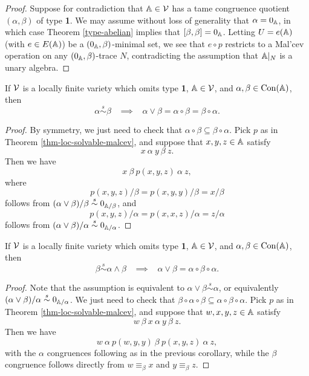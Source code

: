 \begin{appendices}
\begin{proof}
Suppose for contradiction that $\mathbb{A} \in \mathcal{V}$ has a tame congruence quotient $(\alpha,\beta)$ of type \textbf{1}. We may assume without loss of generality that $\alpha = 0_{\mathbb{A}}$, in which case Theorem \ref{type-abelian} implies that $[\beta,\beta] = 0_{\mathbb{A}}$. Letting $U = e(\mathbb{A})$ (with $e \in E(\mathbb{A})$) be a $(0_{\mathbb{A}}, \beta)$-minimal set, we see that $e \circ p$ restricts to a Mal'cev operation on any $(0_{\mathbb{A}},\beta)$-trace $N$, contradicting the assumption that $\mathbb{A}|_N$ is a unary algebra.
\end{proof}

\begin{cor} If $\mathcal{V}$ is a locally finite variety which omits type \textbf{1}, $\mathbb{A} \in \mathcal{V}$, and $\alpha, \beta \in \operatorname{Con}(\mathbb{A})$, then
\[
\alpha \stackrel{s}{\sim} \beta \;\;\; \implies \;\;\; \alpha \vee \beta = \alpha \circ \beta = \beta \circ \alpha.
\]
\end{cor}
\begin{proof} By symmetry, we just need to check that $\alpha \circ \beta \subseteq \beta \circ \alpha$. Pick $p$ as in Theorem \ref{thm-loc-solvable-malcev}, and suppose that $x,y,z \in \mathbb{A}$ satisfy
\[
x\ \alpha\ y\ \beta\ z.
\]
Then we have
\[
x\ \beta\ p(x,y,z)\ \alpha\ z,
\]
where
\[
p(x,y,z)/\beta = p(x,y,y)/\beta = x/\beta
\]
follows from $(\alpha \vee \beta)/\beta \stackrel{s}{\sim} 0_{\mathbb{A}/\beta}$, and
\[
p(x,y,z)/\alpha = p(x,x,z)/\alpha = z/\alpha
\]
follows from $(\alpha \vee \beta)/\alpha \stackrel{s}{\sim} 0_{\mathbb{A}/\alpha}$.
\end{proof}

\begin{cor} If $\mathcal{V}$ is a locally finite variety which omits type \textbf{1}, $\mathbb{A} \in \mathcal{V}$, and $\alpha, \beta \in \operatorname{Con}(\mathbb{A})$, then
\[
\beta \stackrel{s}{\sim} \alpha \wedge \beta \;\;\; \implies \;\;\; \alpha \vee \beta = \alpha \circ \beta \circ \alpha.
\]
\end{cor}
\begin{proof} Note that the assumption is equivalent to $\alpha \vee \beta \stackrel{s}{\sim} \alpha$, or equivalently $(\alpha \vee \beta)/\alpha \stackrel{s}{\sim} 0_{\mathbb{A}/\alpha}$. We just need to check that $\beta \circ \alpha \circ \beta \subseteq \alpha \circ \beta \circ \alpha$. Pick $p$ as in Theorem \ref{thm-loc-solvable-malcev}, and suppose that $w,x,y,z \in \mathbb{A}$ satisfy
\[
w\ \beta\ x\ \alpha\ y\ \beta\ z.
\]
Then we have
\[
w\ \alpha\ p(w,y,y)\ \beta\ p(x,y,z)\ \alpha\ z,
\]
with the $\alpha$ congruences following as in the previous corollary, while the $\beta$ congruence follows directly from $w \equiv_\beta x$ and $y \equiv_\beta z$.
\end{proof}



\end{appendices}
